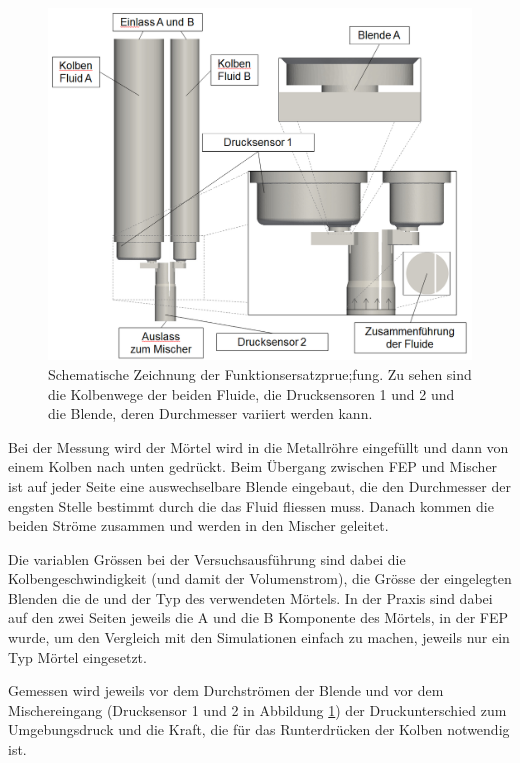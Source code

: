 %
\begin{figure}
    \centering
    \includegraphics[width=\textwidth]{figures/FEP_Schema.png}
    \caption{Schematische Zeichnung der Funktionsersatzprue;fung. Zu sehen sind die Kolbenwege der beiden Fluide,
    die Drucksensoren 1 und 2 und die Blende, deren Durchmesser variiert werden kann.}
    \label{fig:FEP_schema}
\end{figure}

Bei der Messung wird der Mörtel wird in die Metallröhre eingefüllt und dann von einem Kolben nach unten gedrückt. Beim Übergang zwischen FEP und Mischer ist auf jeder Seite eine auswechselbare Blende eingebaut, die den Durchmesser der engsten Stelle bestimmt durch die das Fluid fliessen muss. Danach kommen die beiden Ströme zusammen und werden in den Mischer geleitet.

Die variablen Grössen bei der Versuchsausführung sind dabei die Kolbengeschwindigkeit (und damit der Volumenstrom), die Grösse der eingelegten Blenden die de und der Typ des verwendeten Mörtels. In der Praxis sind dabei auf den zwei Seiten jeweils die A und die B Komponente des Mörtels, in der FEP wurde, um den Vergleich mit den Simulationen einfach zu machen, jeweils nur ein Typ Mörtel eingesetzt.

Gemessen wird jeweils vor dem Durchströmen der Blende und vor dem Mischereingang (Drucksensor 1 und 2 in Abbildung \ref{fig:FEP_schema}) der Druckunterschied zum Umgebungsdruck und die Kraft, die für das Runterdrücken der Kolben notwendig ist.
%
